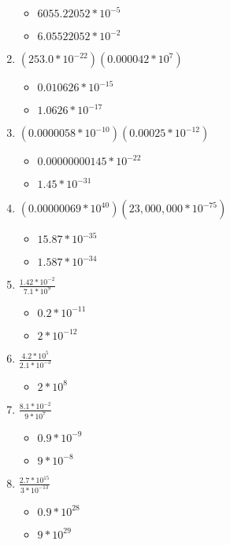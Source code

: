 \begin{enumerate}
  \begin{itemize}
  \item $6055.22052 * 10^{-5}$
  \item $6.05522052 * 10^{-2}$
  \end{itemize}
\item $(253.0*10^{-22})(0.000042*10^{7})$
  \begin{itemize}
  \item $0.010626 * 10^{-15}$
  \item $1.0626 * 10^{-17}$
  \end{itemize}
\item $(0.0000058*10^{-10})(0.00025*10^{-12})$
  \begin{itemize}
  \item $0.00000000145 * 10^{-22}$
  \item $1.45 * 10^{-31}$
  \end{itemize}
\item $(0.00000069*10^{40})(23,000,000*10^{-75})$
  \begin{itemize}
  \item $15.87 * 10^{-35}$
  \item $1.587 * 10^{-34}$
  \end{itemize}
\item {\Large $\frac{1.42*10^{-2}}{7.1*10^{9}}$}
  \begin{itemize}
  \item $0.2 * 10^{-11}$
  \item $2 * 10^{-12}$
  \end{itemize}
\item {\Large $\frac{4.2*10^{5}}{2.1*10^{-3}}$}
  \begin{itemize}
  \item $2 * 10^{8}$
  \end{itemize}
\item {\Large $\frac{8.1*10^{-2}}{9*10^{7}}$}
  \begin{itemize}
  \item $0.9 * 10^{-9}$
  \item $9 * 10^{-8}$
  \end{itemize}
\item {\Large $\frac{2.7*10^{15}}{3*10^{-13}}$}
  \begin{itemize}
  \item $0.9 * 10^{28}$
  \item $9 * 10^{29}$
  \end{itemize}

\end{enumerate}
